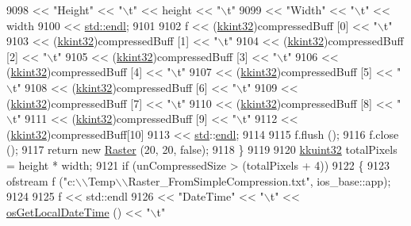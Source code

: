 \begin{DoxyCode}
9098       << \textcolor{stringliteral}{"Height"}           << \textcolor{stringliteral}{"\(\backslash\)t"}  << height                << \textcolor{stringliteral}{"\(\backslash\)t"} 
9099       << \textcolor{stringliteral}{"Width"}            << \textcolor{stringliteral}{"\(\backslash\)t"}  << width
9100       << \hyperlink{namespace_k_k_b_ad1f50f65af6adc8fa9e6f62d007818a8}{std::endl};
9101 
9102     f <<  (\hyperlink{namespace_k_k_b_a8fa4952cc84fda1de4bec1fbdd8d5b1b}{kkint32})compressedBuff [0] << \textcolor{stringliteral}{"\(\backslash\)t"}
9103       <<  (\hyperlink{namespace_k_k_b_a8fa4952cc84fda1de4bec1fbdd8d5b1b}{kkint32})compressedBuff [1] << "\(\backslash\)t"
9104       <<  (\hyperlink{namespace_k_k_b_a8fa4952cc84fda1de4bec1fbdd8d5b1b}{kkint32})compressedBuff [2] << "\(\backslash\)t"
9105       <<  (\hyperlink{namespace_k_k_b_a8fa4952cc84fda1de4bec1fbdd8d5b1b}{kkint32})compressedBuff [3] << "\(\backslash\)t"
9106       <<  (\hyperlink{namespace_k_k_b_a8fa4952cc84fda1de4bec1fbdd8d5b1b}{kkint32})compressedBuff [4] << "\(\backslash\)t"
9107       <<  (\hyperlink{namespace_k_k_b_a8fa4952cc84fda1de4bec1fbdd8d5b1b}{kkint32})compressedBuff [5] << "\(\backslash\)t"
9108       <<  (\hyperlink{namespace_k_k_b_a8fa4952cc84fda1de4bec1fbdd8d5b1b}{kkint32})compressedBuff [6] << "\(\backslash\)t"
9109       <<  (\hyperlink{namespace_k_k_b_a8fa4952cc84fda1de4bec1fbdd8d5b1b}{kkint32})compressedBuff [7] << "\(\backslash\)t"
9110       <<  (\hyperlink{namespace_k_k_b_a8fa4952cc84fda1de4bec1fbdd8d5b1b}{kkint32})compressedBuff [8] << "\(\backslash\)t"
9111       <<  (\hyperlink{namespace_k_k_b_a8fa4952cc84fda1de4bec1fbdd8d5b1b}{kkint32})compressedBuff [9] << "\(\backslash\)t"
9112       <<  (\hyperlink{namespace_k_k_b_a8fa4952cc84fda1de4bec1fbdd8d5b1b}{kkint32})compressedBuff[10] 
9113       << \hyperlink{namespacestd}{std}::\hyperlink{namespace_k_k_b_ad1f50f65af6adc8fa9e6f62d007818a8}{endl};
9114 
9115       f.flush ();
9116       f.close ();
9117     return new \hyperlink{class_k_k_b_1_1_raster}{Raster} (20, 20, false);
9118   \}
9119 
9120   \hyperlink{namespace_k_k_b_af8d832f05c54994a1cce25bd5743e19a}{kkuint32}  totalPixels = height * width;
9121   if  (unCompressedSize > (totalPixels + 4))
9122   \{
9123     ofstream f (\textcolor{stringliteral}{"c:\(\backslash\)\(\backslash\)Temp\(\backslash\)\(\backslash\)Raster\_FromSimpleCompression.txt"}, ios\_base::app);
9124 
9125     f << std::endl
9126       << \textcolor{stringliteral}{"DateTime"}         << \textcolor{stringliteral}{"\(\backslash\)t"}  << \hyperlink{namespace_k_k_b_af54c205cde0465bcb2c74f3881a96413}{osGetLocalDateTime} () << \textcolor{stringliteral}{"\(\backslash\)t"}

\end{DoxyCode}
